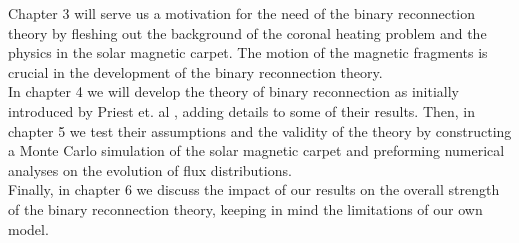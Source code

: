 Chapter 3 will serve us a motivation for the need of the binary reconnection theory by fleshing out the background of the coronal heating problem and the physics in the solar magnetic carpet. The motion of the magnetic fragments is crucial in the development of the binary reconnection theory. \\
In chapter 4 we will develop the theory of binary reconnection as initially introduced by Priest et. al \cite{priest}, adding details to some of their results. Then, in chapter 5 we test their assumptions and the validity of the theory by constructing a Monte Carlo simulation of the solar magnetic carpet and preforming numerical analyses on the evolution of flux distributions. \\
Finally, in chapter 6 we discuss the impact of our results on the overall strength of the binary reconnection theory, keeping in mind the limitations of our own model.